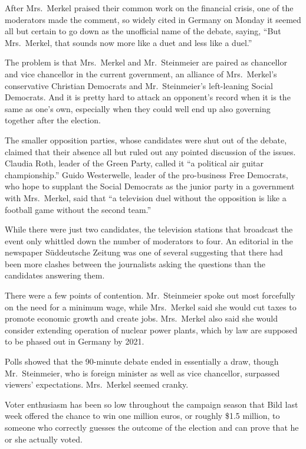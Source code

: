 ﻿\documentclass[12pt]{article}
\begin{document}
After Mrs.~Merkel praised their common work on the financial crisis, one of the moderators made the
comment, so widely cited in Germany on Monday it seemed all but certain to go down as the unofficial
name of the debate, saying, ``But Mrs.~Merkel, that sounds now more like a duet\cite{duet} and less
like a duel.''

The problem is that Mrs.~Merkel and Mr.~Steinmeier are paired as chancellor and vice chancellor in
the current government, an alliance of Mrs.~Merkel's conservative Christian Democrats and
Mr.~Steinmeier's left-leaning Social Democrats. And it is pretty hard to attack an opponent's record
when it is the same as one's own, especially when they could well end up also governing together
after the election.

The smaller opposition parties, whose candidates were shut out of the debate, claimed that their
absence all but ruled out any pointed discussion of the issues. Claudia Roth, leader of the Green
Party, called it ``a political air guitar championship.'' Guido Westerwelle, leader of the
pro-business Free Democrats, who hope to supplant the Social Democrats as the junior party in a
government with Mrs.~Merkel, said that ``a television duel without the opposition is like a football
game without the second team.''

While there were just two candidates, the television stations that broadcast the event only whittled
down the number of moderators to four. An editorial in the newspaper Süddeutsche Zeitung was one of
several suggesting that there had been more clashes between the journalists asking the questions
than the candidates answering them.

There were a few points of contention. Mr.~Steinmeier spoke out most forcefully on the need for a
minimum wage, while Mrs.~Merkel said she would cut taxes to promote economic growth and create jobs.
Mrs.~Merkel also said she would consider extending operation of nuclear power plants, which by law
are supposed to be phased out in Germany by 2021.

Polls showed that the 90-minute debate ended in essentially a draw, though Mr.~Steinmeier, who is
foreign minister as well as vice chancellor, surpassed viewers' expectations. Mrs.~Merkel seemed
cranky.

Voter enthusiasm has been so low throughout the campaign season that Bild last week offered the
chance to win one million euros, or roughly \$1.5 million, to someone who correctly guesses the
outcome of the election and can prove that he or she actually voted.
\end{document}
